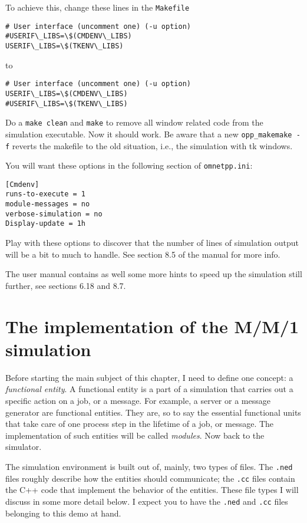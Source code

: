 \documentclass[a4paper]{article}
\begin{document}
To achieve this, change these lines in the  \texttt{Makefile}

\begin{verbatim}
# User interface (uncomment one) (-u option)
#USERIF\_LIBS=\$(CMDENV\_LIBS)
USERIF\_LIBS=\$(TKENV\_LIBS)
\end{verbatim}

to

\begin{verbatim}
# User interface (uncomment one) (-u option)
USERIF\_LIBS=\$(CMDENV\_LIBS)
#USERIF\_LIBS=\$(TKENV\_LIBS)
\end{verbatim}

Do a \texttt{make clean} and \texttt{make} to remove all window
related code from the simulation executable. Now it should work. Be
aware that a new \texttt{opp\_makemake -f} reverts the makefile to the old
situation, i.e., the simulation with tk windows.

You will want these options in the following section of
\texttt{omnetpp.ini}:
\begin{verbatim}
[Cmdenv]
runs-to-execute = 1
module-messages = no
verbose-simulation = no
Display-update = 1h
\end{verbatim}
Play with these options to discover that the number of lines of
simulation output will be a bit to much to handle. See section 8.5 of
the manual for more info.

The user manual contains as well some more hints to speed up the
simulation still further, see sections 6.18 and  8.7.

\section{The implementation of the M/M/1 simulation}
\label{sec:impl-fifo-simul}
Before starting the main subject of this chapter, I need to define one
concept: a \emph{functional entity}. A functional entity is a part of
a simulation that carries out a specific action on a job, or a
message. For example, a server or a message generator are functional
entities. They are, so to say the essential functional units that take
care of one process step in the lifetime of a job, or message. The
implementation of such entities will be called \emph{modules}. Now
back to the simulator.

The simulation environment is built out of, mainly, two types of
files.  The \texttt{.ned} files roughly describe how the entities
should communicate; the \texttt{.cc} files contain the C++ code that
implement the behavior of the entities. These file types I will
discuss in some more detail below. I expect you to have the
\texttt{.ned} and \texttt{.cc} files belonging to this demo at hand.
\end{document}
